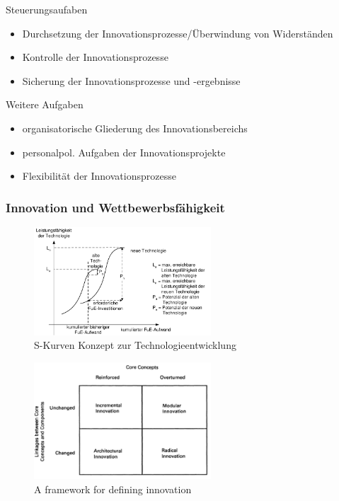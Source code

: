 \documentclass[11pt]{article}
\begin{document}
Steuerungsaufaben
\begin{itemize}
\item Durchsetzung der Innovationsprozesse/Überwindung von Widerständen
\item Kontrolle der Innovationsprozesse
\item Sicherung der Innovationsprozesse und -ergebnisse
\end{itemize}

Weitere Aufgaben
\begin{itemize}
\item organisatorische Gliederung des Innovationsbereichs
\item personalpol. Aufgaben der Innovationsprojekte
\item Flexibilität der Innovationsprozesse
\end{itemize}

\subsubsection{Innovation und Wettbewerbsfähigkeit}
\label{sec:org253311b}
\begin{figure}[htbp]
\centering
\includegraphics[width=250px]{./pictures/inskurv.png}
\caption{S-Kurven Konzept zur Technologieentwicklung}
\end{figure} 

\begin{figure}[htbp]
\centering
\includegraphics[width=250px]{./pictures/insfram.png}
\caption{A framework for defining innovation}
\end{figure} 
\end{document}
